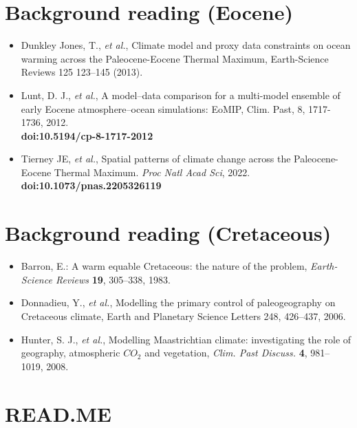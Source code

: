 \section*{Background reading (Eocene)}
\begin{itemize}
\vspace{1mm}
\item Dunkley Jones, T., \textit{et al.}, Climate model and proxy data constraints on ocean warming across the Paleocene-Eocene Thermal Maximum, Earth-Science Reviews 125 123–145 (2013).
\vspace{1mm}
\item Lunt, D. J., \textit{et al.}, A model–data comparison for a multi-model ensemble of early Eocene atmosphere–ocean simulations: EoMIP, Clim. Past, 8, 1717-1736, 2012.
\\\textbf{doi:10.5194/cp-8-1717-2012}
\vspace{1mm}
\item Tierney JE, \textit{et al.}, Spatial patterns of climate change across the Paleocene-Eocene Thermal Maximum. \textit{Proc Natl Acad Sci}, 2022. 
\\\textbf{doi:10.1073/pnas.2205326119}
\end{itemize}

\section*{Background reading (Cretaceous)}
\begin{itemize}
\vspace{1mm}
\item Barron, E.: A warm equable Cretaceous: the nature of the problem, \textit{Earth-Science Reviews} \textbf{19}, 305–338, 1983.
\vspace{1mm}
\item Donnadieu, Y., \textit{et al.}, Modelling the primary control of paleogeography on Cretaceous climate, Earth and Planetary Science Letters 248, 426–437, 2006.
\vspace{1mm}
\item Hunter, S. J., \textit{et al.}, Modelling Maastrichtian climate: investigating the role of geography, atmospheric \(CO_{2}\) and vegetation, \textit{Clim. Past Discuss.} \textbf{4}, 981–1019, 2008.
\end{itemize}

\newpage

\section*{READ.ME}

